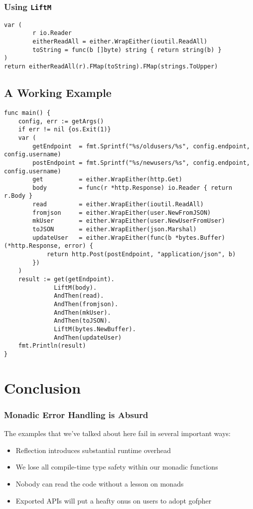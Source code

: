 \documentclass{beamer}
\begin{document}
\begin{frame}[fragile]
  \frametitle{Using {\tt LiftM}}
\begin{lstlisting}[language=Golang]
var (
        r io.Reader
        eitherReadAll = either.WrapEither(ioutil.ReadAll)
        toString = func(b []byte) string { return string(b) }
)
return eitherReadAll(r).FMap(toString).FMap(strings.ToUpper)
\end{lstlisting}
\end{frame}

\subsection{A Working Example}
\begin{frame}[fragile]
\begin{lstlisting}[language=Golang]
func main() {
    config, err := getArgs()
    if err != nil {os.Exit(1)}
    var (
        getEndpoint  = fmt.Sprintf("%s/oldusers/%s", config.endpoint, config.username)
        postEndpoint = fmt.Sprintf("%s/newusers/%s", config.endpoint, config.username)
        get          = either.WrapEither(http.Get)
        body         = func(r *http.Response) io.Reader { return r.Body }
        read         = either.WrapEither(ioutil.ReadAll)
        fromjson     = either.WrapEither(user.NewFromJSON)
        mkUser       = either.WrapEither(user.NewUserFromUser)
        toJSON       = either.WrapEither(json.Marshal)
        updateUser   = either.WrapEither(func(b *bytes.Buffer) (*http.Response, error) {
            return http.Post(postEndpoint, "application/json", b)
        })
    )
    result := get(getEndpoint).
              LiftM(body).
              AndThen(read).
              AndThen(fromjson).
              AndThen(mkUser).
              AndThen(toJSON).
              LiftM(bytes.NewBuffer).
              AndThen(updateUser)
    fmt.Println(result)
}
\end{lstlisting}
\end{frame}

\section{Conclusion}

\begin{frame}
  \frametitle{Monadic Error Handling is Absurd}
  The examples that we've talked about here fail in several important ways:
  \begin{itemize}
  \item Reflection introduces substantial runtime overhead
  \item We lose all compile-time type safety within our monadic functions
  \item Nobody can read the code without a lesson on monads
  \item Exported APIs will put a heafty onus on users to adopt gofpher
  \end{itemize}
\end{frame}
\end{document}
